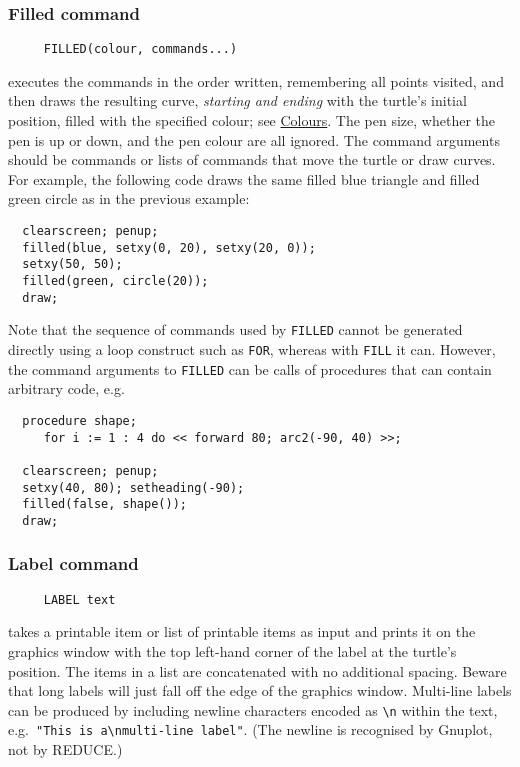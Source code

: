 \subsubsection*{Filled command}
\begin{verbatim}
     FILLED(colour, commands...)
\end{verbatim}
executes the commands in the order written, remembering all points
visited, and then draws the resulting curve, \emph{starting and
ending} with the turtle's initial position, filled with the specified
colour; see \hyperref[logoturtle:Colours]{Colours}.  The pen size,
whether the pen is up or down, and the pen colour are all ignored.
The command arguments should be commands or lists of commands that
move the turtle or draw curves.  For example, the following code draws
the same filled blue triangle and filled green circle as in the
previous example:
\begin{verbatim}
  clearscreen; penup;
  filled(blue, setxy(0, 20), setxy(20, 0));
  setxy(50, 50);
  filled(green, circle(20));
  draw;
\end{verbatim}
Note that the sequence of commands used by \texttt{FILLED} cannot be
generated directly using a loop construct such as \texttt{FOR},
whereas with \texttt{FILL} it can.  However, the command arguments to
\texttt{FILLED} can be calls of procedures that can contain arbitrary
code, e.g.
\begin{verbatim}
  procedure shape;
     for i := 1 : 4 do << forward 80; arc2(-90, 40) >>;

  clearscreen; penup;
  setxy(40, 80); setheading(-90);
  filled(false, shape());
  draw;
\end{verbatim}

\subsubsection*{Label command}
\begin{verbatim}
     LABEL text
\end{verbatim}
takes a printable item or list of printable items as input and prints
it on the graphics window with the top left-hand corner of the label
at the turtle's position.  The items in a list are concatenated with
no additional spacing.  Beware that long labels will just fall off the
edge of the graphics window.  Multi-line labels can be produced by
including newline characters encoded as \texttt{\textbackslash n}
within the text, e.g.\ \texttt{"This is a\textbackslash nmulti-line
  label"}.  (The newline is recognised by Gnuplot, not by REDUCE.)

